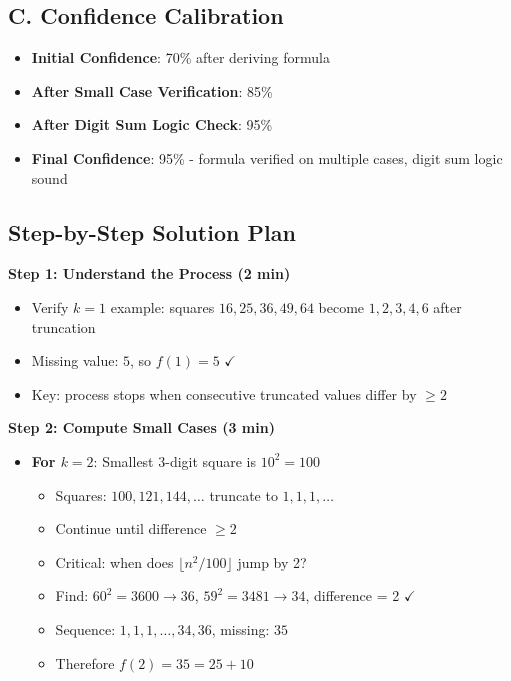 \documentclass[]{article}
\begin{document}
\begin{verificationbox}
\subsection*{C. Confidence Calibration}
\begin{itemize}[leftmargin=*]
    \item \textbf{Initial Confidence}: 70\% after deriving formula
    \item \textbf{After Small Case Verification}: 85\%
    \item \textbf{After Digit Sum Logic Check}: 95\%
    \item \textbf{Final Confidence}: 95\% - formula verified on multiple cases, digit sum logic sound
\end{itemize}
\end{verificationbox}

\begin{solutionbox}
\subsection*{Step-by-Step Solution Plan}

\textbf{Step 1: Understand the Process (2 min)}
\begin{itemize}[leftmargin=*]
    \item Verify $k=1$ example: squares $16,25,36,49,64$ become $1,2,3,4,6$ after truncation
    \item Missing value: $5$, so $f(1) = 5$ $\checkmark$
    \item Key: process stops when consecutive truncated values differ by $\geq 2$
\end{itemize}

\textbf{Step 2: Compute Small Cases (3 min)}
\begin{itemize}[leftmargin=*]
    \item \textbf{For $k=2$}: Smallest 3-digit square is $10^2 = 100$
    \begin{itemize}
        \item Squares: $100, 121, 144, \ldots$ truncate to $1, 1, 1, \ldots$
        \item Continue until difference $\geq 2$
        \item Critical: when does $\lfloor n^2/100 \rfloor$ jump by 2?
        \item Find: $60^2 = 3600 \to 36$, $59^2 = 3481 \to 34$, difference = 2 $\checkmark$
        \item Sequence: $1,1,1,\ldots,34,36$, missing: $35$
        \item Therefore $f(2) = 35 = 25 + 10$
    \end{itemize}
    

\end{itemize}
\end{solutionbox}
\end{document}
